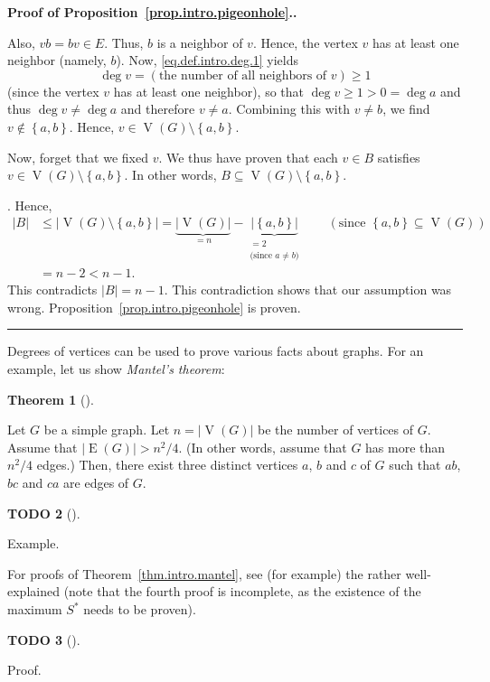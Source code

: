 \documentclass[numbers=enddot,12pt,final,onecolumn,notitlepage]{scrartcl}%
\theoremstyle{definition}
\newtheorem{theo}{Theorem}[subsection]
\newenvironment{theorem}[1][]
{\begin{theo}[#1]\begin{leftbar}}
{\end{leftbar}\end{theo}}
\newtheorem{quest}[theo]{TODO}
\newenvironment{todo}[1][]
{\begin{quest}[#1]\begin{leftbar}}
{\end{leftbar}\end{quest}}
\newenvironment{proof}[1][Proof]{\noindent\textbf{#1.} }{\ \rule{0.5em}{0.5em}}
\newcommand{\set}[1]{\left\{ #1 \right\}}
\newcommand{\abs}[1]{\left| #1 \right|}
\newcommand{\verts}[1]{\operatorname{V}\left( #1 \right)}
\newcommand{\edges}[1]{\operatorname{E}\left( #1 \right)}
\newcommand{\underbrack}[2]{\underbrace{#1}_{\substack{#2}}}
\begin{document}
\begin{proof}[Proof of Proposition~\ref{prop.intro.pigeonhole}.]
{Also, $vb = bv \in E$. Thus, $b$ is a neighbor of $v$. Hence, the
vertex $v$ has at least one neighbor (namely, $b$).
Now, \eqref{eq.def.intro.deg.1} yields
\[
\deg v = \left(\text{the number of all neighbors of } v\right)
\geq 1
\]
(since the vertex $v$ has at least one neighbor), so that
$\deg v \geq 1 > 0 = \deg a$ and thus $\deg v \neq \deg a$ and
therefore $v \neq a$. Combining this with $v \neq b$, we find
$v \notin \set{a, b}$. Hence, $v \in \verts{G} \setminus \set{a, b}$.

Now, forget that we fixed $v$. We thus have proven that each $v \in B$
satisfies $v \in \verts{G} \setminus \set{a, b}$. In other words,
$B \subseteq \verts{G} \setminus \set{a, b}$.}. Hence,
\begin{align*}
\abs{B} &\leq \abs{\verts{G} \setminus \set{a, b}}
= \underbrace{\abs{\verts{G}}}_{= n}
- \underbrack{\abs{\set{a, b}}}{
                = 2 \\ \text{(since } a \neq b \text{)}}
\qquad \left(\text{since } \set{a, b} \subseteq \verts{G} \right) \\
&= n - 2 < n - 1 .
\end{align*}
This contradicts $\abs{B} = n - 1$. This contradiction shows that our
assumption was wrong. Proposition~\ref{prop.intro.pigeonhole} is
proven.
\end{proof}

Degrees of vertices can be used to prove various facts about graphs.
For an example, let us show \textit{Mantel's theorem}:

\begin{theorem} \label{thm.intro.mantel}
Let $G$ be a simple graph. Let $n = \abs{\verts{G}}$ be the number of
vertices of $G$. Assume that $\abs{\edges{G}} > n^2 / 4$. (In other
words, assume that $G$ has more than $n^2 / 4$ edges.) Then, there
exist three distinct vertices $a$,
$b$ and $c$ of $G$ such that $ab$, $bc$ and $ca$ are edges of $G$.
\end{theorem}

\begin{todo}
Example.
\end{todo}

For proofs of Theorem~\ref{thm.intro.mantel}, see (for example) the
rather well-explained \cite{Choo16} (note that the fourth proof is
incomplete, as the existence of the maximum $S^*$ needs to be proven).

\begin{todo}
Proof.
\end{todo}
\end{document}
